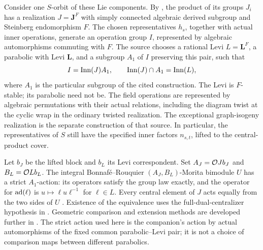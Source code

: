 Consider one $S$-orbit of these Lie components.
By \cite[Lemmas~9.2--9.4]{OpenAIFieldDonovan2026}, the product of
its groups $J_i$ has a realization $J=\mathbf J^F$ with simply
connected algebraic derived subgroup and Steinberg endomorphism $F$.
The chosen representatives
$h_s$, together with actual inner operations, generate an operation
group $I$, represented by algebraic automorphisms commuting with $F$.
The source chooses a rational Levi $L=\mathbf L^F$,
a parabolic with Levi $\mathbf L$, and a subgroup $A_1$ of $I$
preserving this pair, such that
\begin{equation}\label{eq:I-decomposition}
 I=\operatorname{Inn}(J)A_1,\qquad \operatorname{Inn}(J)\cap A_1=\operatorname{Inn}(L),
\end{equation}
where $A_1$ is the particular subgroup of the cited construction.
The Levi is $F$-stable; its parabolic need not be.  The field
operations are represented by algebraic permutations with their
actual relations, including the diagram twist at the cyclic wrap
in the ordinary twisted realization.  The exceptional graph-isogeny
realization is the separate
construction of that source.  In particular,
the representatives of $S$ still have the specified inner factors
$n_{s,t}$, lifted to the central-product cover.

Let $b_J$ be the lifted block and $b_L$ its Levi correspondent.
Set $A_J=\mathcal O Jb_J$ and $B_L=\mathcal O Lb_L$.  The integral
Bonnaf\'e--Rouquier $(A_J,B_L)$-Morita bimodule $U$ has a strict
$A_1$-action: its operators satisfy the group law exactly, and the
operator for $\operatorname{ad}(\ell)$ is $u\mapsto\ell u\ell^{-1}$ for
$\ell\in L$.  Every central element of $J$ acts equally from
the two sides of $U$
\cite[Lemma~9.5]{OpenAIFieldDonovan2026}.  Existence of the
equivalence uses the full-dual-centralizer hypothesis in
\cite[Section~11.4, Theorem~B$'$]{BR2003}.  Geometric comparison and
extension methods are developed further in
\cite[Sections~6--7]{BDR2017}.  The strict action used here is the
companion's action by actual automorphisms of the fixed common
parabolic--Levi pair; it is not a choice of comparison maps between
different parabolics.

